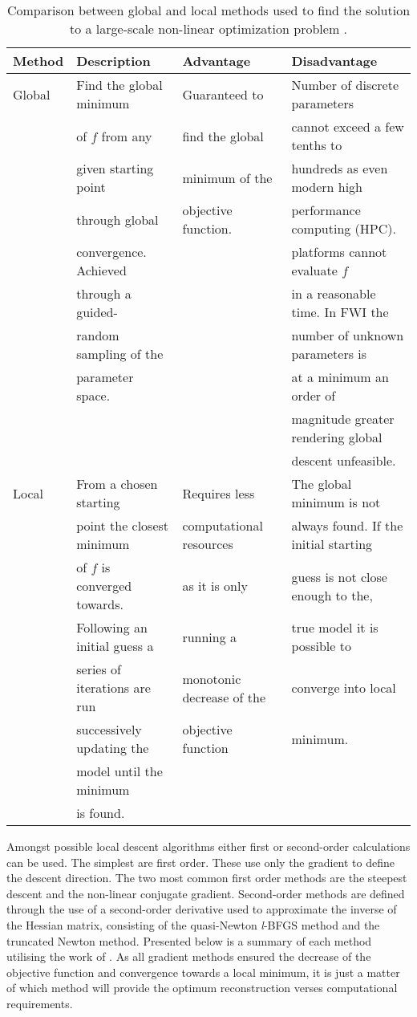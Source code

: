 \begin{table}[!ht]
\centering
\caption[Comparison between global and local methods]{Comparison between global and local methods used to find the solution to a large-scale non-linear optimization problem \citep{metivier2016seiscope}.}
\label{globalvslocal}
\begin{tabular}{|l|l|l|l|}
\hline
Method & Description & Advantage & Disadvantage \\ \hline
Global & Find the global minimum & Guaranteed to & Number of discrete parameters \\
& of $f$ from any & find the global &cannot exceed a few tenths to \\
& given starting point & minimum of the & hundreds as even modern high \\
& through global & objective function. & performance computing (HPC). \\
& convergence. Achieved & & platforms cannot evaluate $f$ \\
& through a guided- & & in a reasonable time. In FWI the \\ 
& random sampling of the & & number of unknown parameters is \\
&parameter space. & & at a minimum an order of \\ 
& & &magnitude greater rendering global \\ 
& & & descent unfeasible. \\ \hline
Local & From a chosen starting & Requires less & The global minimum is not \\
& point the closest minimum &computational resources & always found. If the initial starting \\
& of $f$ is converged towards. & as it is only & guess is not close enough to the, \\
& Following an initial guess a &running a &true model it is possible to \\
& series of iterations are run & monotonic decrease of the & converge into local \\
& successively updating the &objective function &minimum. \\
& model until the minimum & & \\ 
& is found. & & \\ \hline
\end{tabular}
\end{table}

Amongst possible local descent algorithms either first or second-order calculations can be used. The simplest are first order. These use only the gradient to define the descent direction. The two most common first order methods are the steepest descent and the non-linear conjugate gradient. Second-order methods are defined through the use of a second-order derivative used to approximate the inverse of the Hessian matrix, consisting of the quasi-Newton \textit{l}-BFGS method and the truncated Newton method. Presented below is a summary of each method utilising the work of \citet{metivier2016seiscope}. As all gradient methods ensured the decrease of the objective function and convergence towards a local minimum, it is just a matter of which method will provide the optimum reconstruction verses computational requirements.


